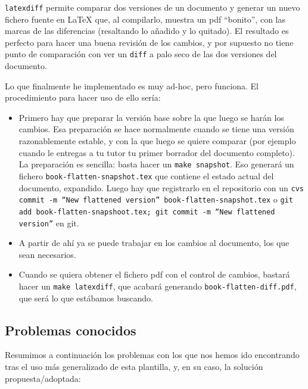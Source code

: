 \documentclass[spanish,openright]{book}
\begin{document}
\texttt{latexdiff} permite comparar dos versiones de un documento y
generar un nuevo fichero fuente en \LaTeX{} que, al compilarlo, muestra un
pdf ``bonito'', con las marcas de las diferencias (resaltando lo añadido
y lo quitado). El resultado es perfecto para hacer una buena revisión de
los cambios, y por supuesto no tiene punto de comparación con ver un
\texttt{diff} a palo seco de las dos versiones del documento. 

Lo que finalmente he implementado es muy ad-hoc, pero funciona. El
procedimiento para hacer uso de ello sería:

\begin{itemize}
\item Primero hay que preparar la versión base sobre la que luego se
  harán los cambios. Esa preparación se hace normalmente cuando se
  tiene una versión razonablemente estable, y con la que luego se
  quiere comparar (por ejemplo cuando le entregas a tu tutor tu primer
  borrador del documento completo). La preparación es sencilla: basta
  hacer un \texttt{make snapshot}. Eso generará un fichero
  \texttt{book-flatten-snapshot.tex} que contiene el estado actual del
  documento, expandido. Luego hay que registrarlo en el repositorio
  con un \texttt{cvs commit -m ``New flattened version''
    book-flatten-snapshot.tex} o \texttt{git add book-flatten-snapshoot.tex; git commit
    -m ``New flattened version''} en git.
\item A partir de ahí ya se puede trabajar en los cambios al documento,
  los que sean necesarios.
\item Cuando se quiera obtener el fichero pdf con el control de cambios,
  bastará hacer un \texttt{make latexdiff}, que acabará generando
  \texttt{book-flatten-diff.pdf}, que será lo que estábamos buscando.
\end{itemize}



\subsection{Problemas conocidos}
\label{sec:problemas-conocidos}

Resumimos a continuación los problemas con los que nos hemos ido
encontrando tras el uso más generalizado de esta plantilla, y, en su
caso, la solución propuesta/adoptada:
\end{document}
